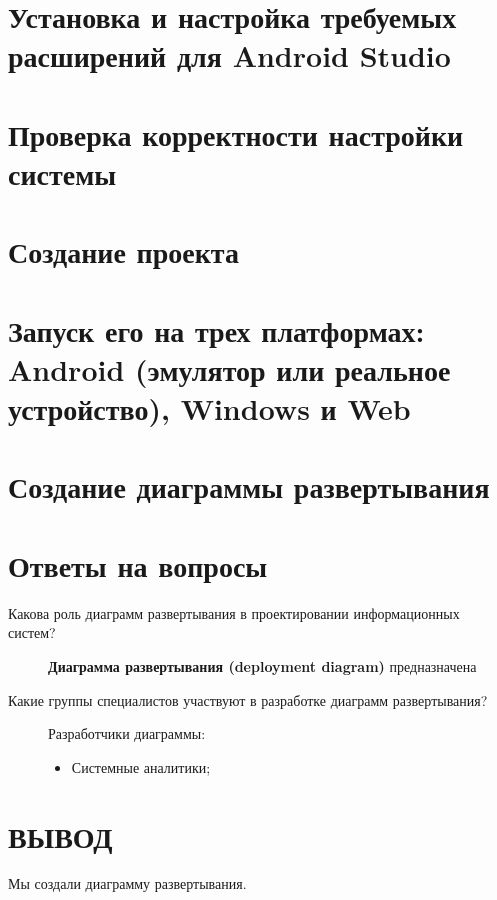 \section{Установка и настройка требуемых расширений для Android Studio}
\section{Проверка корректности настройки системы}
\section{Создание проекта}
\section{Запуск его на трех платформах: Android (эмулятор или реальное устройство), Windows и Web}
\section{Создание диаграммы развертывания}

\clearpage

\section*{Ответы на вопросы}

\begin{description}
	\item [Какова роль диаграмм развертывания в проектировании
		информационных систем?]
		\textbf{Диаграмма развертывания (deployment diagram)} предназначена
	\item [Какие группы специалистов участвуют в разработке диаграмм
		развертывания?]
		Разработчики диаграммы:
		\begin{itemize}
			\item Системные аналитики;
		\end{itemize}
\end{description}

\clearpage

\section*{ВЫВОД}
Мы создали диаграмму развертывания.\par

